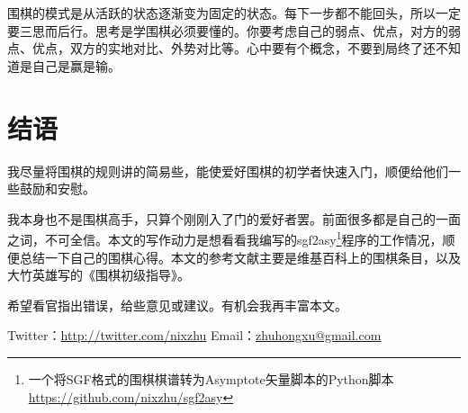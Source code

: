 \documentclass[12pt，a4paper, titlepage]{article}
\begin{document}
围棋的模式是从活跃的状态逐渐变为固定的状态。每下一步都不能回头，所以一定要三思而后行。思考是学围棋必须要懂的。你要考虑自己的弱点、优点，对方的弱点、优点，双方的实地对比、外势对比等。心中要有个概念，不要到局终了还不知道是自己是赢是输。

\section{结语}
我尽量将围棋的规则讲的简易些，能使爱好围棋的初学者快速入门，顺便给他们一些鼓励和安慰。

我本身也不是围棋高手，只算个刚刚入了门的爱好者罢。前面很多都是自己的一面之词，不可全信。本文的写作动力是想看看我编写的sgf2asy\footnote{一个将SGF格式的围棋棋谱转为Asymptote矢量脚本的Python脚本 \url{https://github.com/nixzhu/sgf2asy}}程序的工作情况，顺便总结一下自己的围棋心得。本文的参考文献主要是维基百科上的围棋条目，以及大竹英雄写的《围棋初级指导》。

希望看官指出错误，给些意见或建议。有机会我再丰富本文。

Twitter：\url{http://twitter.com/nixzhu}
Email：\href{mailto:zhuhongxu@gmail.com}{zhuhongxu@gmail.com}
\end{document}
